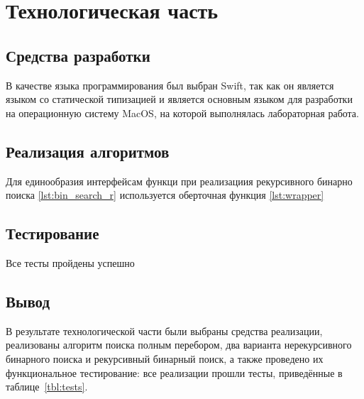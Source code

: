 \chapter{Технологическая часть}
\section{Средства разработки}
В качестве языка программирования был выбран Swift, так как он является языком со статической типизацией и является основным языком для разработки на операционную систему MacOS, на которой выполнялась лабораторная работа.
\section{Реализация алгоритмов} 








Для единообразия интерфейсам функци при реализациия рекурсивного бинарно поиска \ref{lst:bin_search_r} используется оберточная функция \ref{lst:wrapper}

\section{Тестирование}

Все тесты пройдены успешно

\section{Вывод}
В результате технологической части были выбраны средства реализации,
реализованы алгоритм поиска полным перебором, два варианта нерекурсивного
бинарного поиска и рекурсивный бинарный поиск, а также проведено их
функциональное тестирование: все реализации прошли тесты, приведённые
в таблице~\ref{tbl:tests}.


